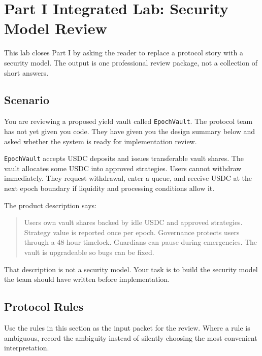 \chapter*{Part I Integrated Lab: Security Model Review}
{}

\begin{labbox}
This lab closes Part I by asking the reader to replace a protocol story with a security model. The output is one professional review package, not a collection of short answers.
\end{labbox}

\section*{Scenario}

You are reviewing a proposed yield vault called \texttt{EpochVault}. The protocol team has not yet given you code. They have given you the design summary below and asked whether the system is ready for implementation review.

\texttt{EpochVault} accepts USDC deposits and issues transferable vault shares. The vault allocates some USDC into approved strategies. Users cannot withdraw immediately. They request withdrawal, enter a queue, and receive USDC at the next epoch boundary if liquidity and processing conditions allow it.

The product description says:

\begin{quote}
Users own vault shares backed by idle USDC and approved strategies. Strategy value is reported once per epoch. Governance protects users through a 48-hour timelock. Guardians can pause during emergencies. The vault is upgradeable so bugs can be fixed.
\end{quote}

That description is not a security model. Your task is to build the security model the team should have written before implementation.

\section*{Protocol Rules}

Use the rules in this section as the input packet for the review. Where a rule is ambiguous, record the ambiguity instead of silently choosing the most convenient interpretation.

